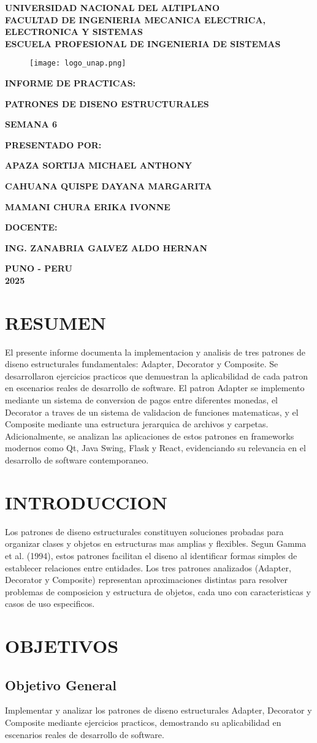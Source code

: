 \documentclass[11pt,a4paper]{article}
\newcommand{\Institution}{Universidad Nacional del Altiplano\xspace}
\renewcommand{\maketitle}
{
    \thispagestyle{empty}
    \begin{center}
        {\fontsize{18pt}{1em} \textbf{\MakeUppercase{\Institution}}}\\
        \vspace*{0.34cm}
        {\fontsize{16pt}{1em} \textbf{\MakeUppercase{Facultad de Ingenieria Mecanica Electrica, Electronica y Sistemas}}}\\
        \vspace*{0.34cm}
        {\fontsize{14pt}{1em} \textbf{\MakeUppercase{Escuela Profesional de Ingenieria de Sistemas}}}\\
    \end{center}        
    \vspace*{1.2cm}
    
    \begin{figure}[h]
    \center
    \texttt{[image: logo\_unap.png]}
    \end{figure}

    \begin{center}
        \vspace*{1.05cm}
        {\fontsize{14pt}{1em} \textbf {INFORME DE PRACTICAS:} \par}
        \vspace*{0.6cm}
        \begin{spacing}{1.5}
        {\fontsize{14pt}{1em} \textbf {PATRONES DE DISENO ESTRUCTURALES} \par}
        {\fontsize{14pt}{1em} \textbf {SEMANA 6} \par}
        \end{spacing}
        \vspace*{1.05cm}
        {\fontsize{14pt}{1em} \textbf {PRESENTADO POR:}\par}
        \vspace*{0.45cm}
        {\fontsize{14pt}{1em} \textbf {APAZA SORTIJA MICHAEL ANTHONY} \par}
        {\fontsize{14pt}{1em} \textbf {CAHUANA QUISPE DAYANA MARGARITA} \par}
        {\fontsize{14pt}{1em} \textbf {MAMANI CHURA ERIKA IVONNE} \par}
        \vspace*{0.6cm}
        {\fontsize{14pt}{1em} \textbf{DOCENTE:} \par}
        \vspace*{0.6cm}
        {\fontsize{16pt}{1em} \textbf{\MakeUppercase{Ing. Zanabria Galvez Aldo Hernan}} \par}
        \vspace*{1.05cm}
        {\fontsize{14pt}{1em} \textbf{PUNO - PERU}}\\
        \vspace*{0.45cm}
        {\fontsize{14pt}{1em} \textbf{2025}}
    \end{center}
    
    \pagebreak
}
\begin{document}
\maketitle


\section*{RESUMEN}

El presente informe documenta la implementacion y analisis de tres patrones de diseno estructurales fundamentales: Adapter, Decorator y Composite. Se desarrollaron ejercicios practicos que demuestran la aplicabilidad de cada patron en escenarios reales de desarrollo de software. El patron Adapter se implemento mediante un sistema de conversion de pagos entre diferentes monedas, el Decorator a traves de un sistema de validacion de funciones matematicas, y el Composite mediante una estructura jerarquica de archivos y carpetas. Adicionalmente, se analizan las aplicaciones de estos patrones en frameworks modernos como Qt, Java Swing, Flask y React, evidenciando su relevancia en el desarrollo de software contemporaneo.

\section{INTRODUCCION}

Los patrones de diseno estructurales constituyen soluciones probadas para organizar clases y objetos en estructuras mas amplias y flexibles. Segun Gamma et al. (1994), estos patrones facilitan el diseno al identificar formas simples de establecer relaciones entre entidades. Los tres patrones analizados (Adapter, Decorator y Composite) representan aproximaciones distintas para resolver problemas de composicion y estructura de objetos, cada uno con caracteristicas y casos de uso especificos.

\section{OBJETIVOS}

\subsection{Objetivo General}

Implementar y analizar los patrones de diseno estructurales Adapter, Decorator y Composite mediante ejercicios practicos, demostrando su aplicabilidad en escenarios reales de desarrollo de software.
\end{document}
